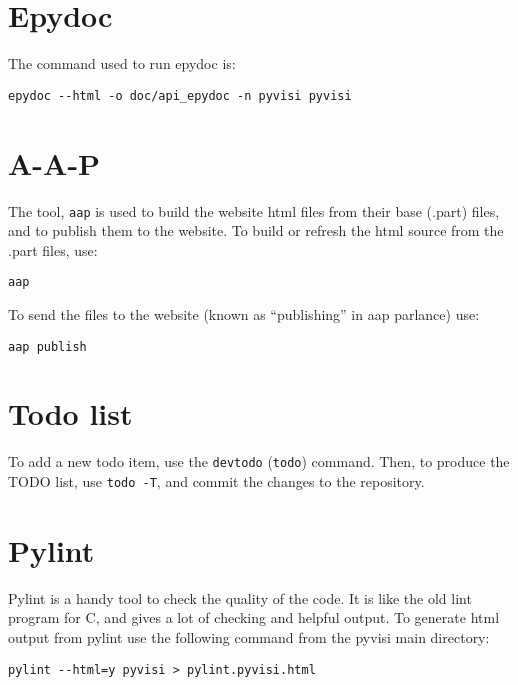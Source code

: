 \documentclass[12pt,a4paper]{article}
\begin{document}
\section{Epydoc}

The command used to run epydoc is:
\begin{verbatim}
epydoc --html -o doc/api_epydoc -n pyvisi pyvisi
\end{verbatim}

\section{A-A-P}

The tool, \texttt{aap} is used to build the website html files from their base
(.part) files, and to publish them to the website.  To build or refresh the
html source from the .part files, use:
\begin{verbatim}
aap
\end{verbatim}
To send the files to the website (known as ``publishing'' in aap parlance)
use:
\begin{verbatim}
aap publish
\end{verbatim}

\section{Todo list}

To add a new todo item, use the \texttt{devtodo} (\texttt{todo}) command.
Then, to produce the TODO list, use \texttt{todo -T}, and commit the changes
to the repository.

\section{Pylint}

Pylint is a handy tool to check the quality of the code.  It is like the old
lint program for C, and gives a lot of checking and helpful output.  To
generate html output from pylint use the following command from the pyvisi
main directory:
\begin{verbatim}
pylint --html=y pyvisi > pylint.pyvisi.html
\end{verbatim}
\end{document}
